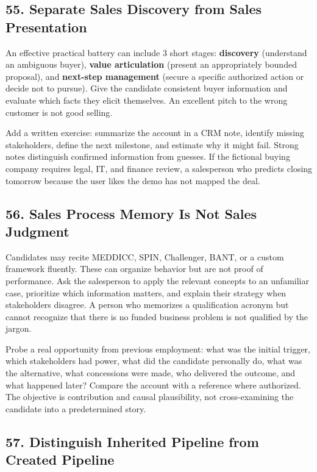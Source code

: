 \subsection*{55. Separate Sales Discovery from Sales Presentation}

An effective practical battery can include 3 short stages: \textbf{discovery} (understand an ambiguous buyer), \textbf{value articulation} (present an appropriately bounded proposal), and \textbf{next-step management} (secure a specific authorized action or decide not to pursue). Give the candidate consistent buyer information and evaluate which facts they elicit themselves. An excellent pitch to the wrong customer is not good selling.

Add a written exercise: summarize the account in a CRM note, identify missing stakeholders, define the next milestone, and estimate why it might fail. Strong notes distinguish confirmed information from guesses. If the fictional buying company requires legal, IT, and finance review, a salesperson who predicts closing tomorrow because the user likes the demo has not mapped the deal.

\subsection*{56. Sales Process Memory Is Not Sales Judgment}

Candidates may recite MEDDICC, SPIN, Challenger, BANT, or a custom framework fluently. These can organize behavior but are not proof of performance. Ask the salesperson to apply the relevant concepts to an unfamiliar case, prioritize which information matters, and explain their strategy when stakeholders disagree. A person who memorizes a qualification acronym but cannot recognize that there is no funded business problem is not qualified by the jargon.

Probe a real opportunity from previous employment: what was the initial trigger, which stakeholders had power, what did the candidate personally do, what was the alternative, what concessions were made, who delivered the outcome, and what happened later? Compare the account with a reference where authorized. The objective is contribution and causal plausibility, not cross-examining the candidate into a predetermined story.

\subsection*{57. Distinguish Inherited Pipeline from Created Pipeline}

